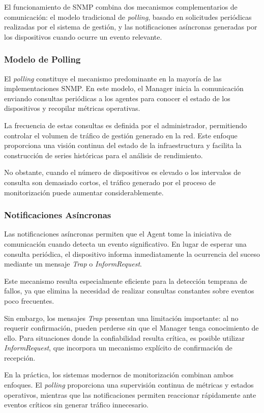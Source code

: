 El funcionamiento de SNMP combina dos mecanismos complementarios de comunicación: el modelo tradicional de \textit{polling}, basado en solicitudes periódicas realizadas por el sistema de gestión, y las notificaciones asíncronas generadas por los dispositivos cuando ocurre un evento relevante.

\subsubsection{Modelo de Polling}

El \textit{polling} constituye el mecanismo predominante en la mayoría de las implementaciones SNMP. En este modelo, el Manager inicia la comunicación enviando consultas periódicas a los agentes para conocer el estado de los dispositivos y recopilar métricas operativas.

La frecuencia de estas consultas es definida por el administrador, permitiendo controlar el volumen de tráfico de gestión generado en la red. Este enfoque proporciona una visión continua del estado de la infraestructura y facilita la construcción de series históricas para el análisis de rendimiento.

No obstante, cuando el número de dispositivos es elevado o los intervalos de consulta son demasiado cortos, el tráfico generado por el proceso de monitorización puede aumentar considerablemente.

\subsubsection{Notificaciones Asíncronas}

Las notificaciones asíncronas permiten que el Agent tome la iniciativa de comunicación cuando detecta un evento significativo. En lugar de esperar una consulta periódica, el dispositivo informa inmediatamente la ocurrencia del suceso mediante un mensaje \textit{Trap} o \textit{InformRequest}.

Este mecanismo resulta especialmente eficiente para la detección temprana de fallos, ya que elimina la necesidad de realizar consultas constantes sobre eventos poco frecuentes.

Sin embargo, los mensajes \textit{Trap} presentan una limitación importante: al no requerir confirmación, pueden perderse sin que el Manager tenga conocimiento de ello. Para situaciones donde la confiabilidad resulta crítica, es posible utilizar \textit{InformRequest}, que incorpora un mecanismo explícito de confirmación de recepción.

En la práctica, los sistemas modernos de monitorización combinan ambos enfoques. El \textit{polling} proporciona una supervisión continua de métricas y estados operativos, mientras que las notificaciones permiten reaccionar rápidamente ante eventos críticos sin generar tráfico innecesario.

